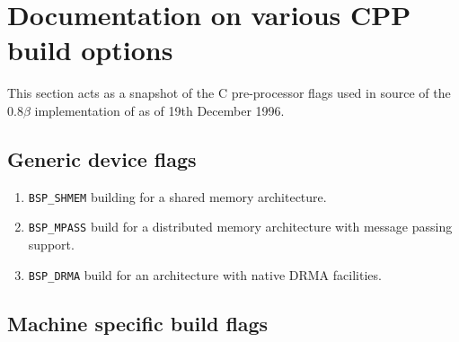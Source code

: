 \section{Documentation on various CPP build options}

This section acts as a snapshot of the C pre-processor flags used in
source of the $0.8\beta$ implementation of \bsplib{} as of 19th
December 1996.
\subsection{Generic device flags}

\begin{enumerate}
\item \texttt{BSP\_SHMEM} building for a shared memory architecture.

\item \texttt{BSP\_MPASS} build for a distributed memory architecture
  with message passing support.

\item \texttt{BSP\_DRMA} build for an architecture with native DRMA
  facilities.
\end{enumerate}

\subsection{Machine specific build flags}


